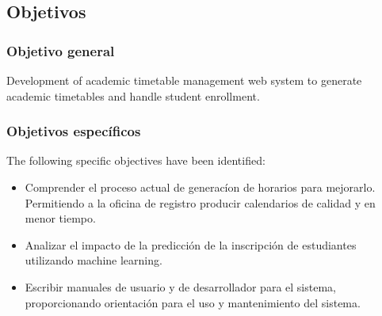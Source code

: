 \subsection{Objetivos}

\subsubsection{Objetivo general}
Development of academic timetable management web system to generate academic timetables and handle student enrollment.

\subsubsection{Objetivos específicos}
The following specific objectives have been identified:
\begin{itemize}
    \item Comprender el proceso actual de generacíon de horarios para mejorarlo.
    Permitiendo a la oficina de registro producir calendarios de calidad y en menor tiempo.
    \item Analizar el impacto de la predicción de la inscripción de estudiantes utilizando machine learning.
    \item Escribir manuales de usuario y de desarrollador para el sistema, proporcionando orientación para el uso y mantenimiento del sistema.
\end{itemize}

